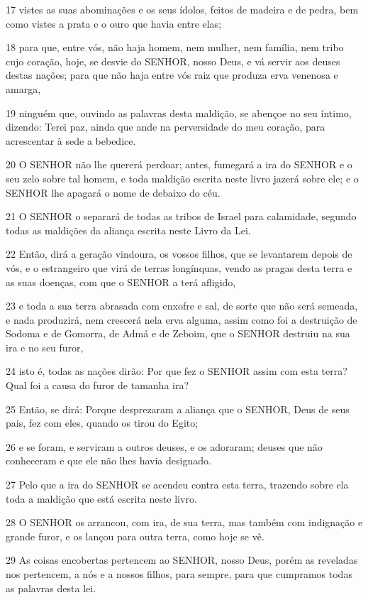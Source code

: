 \par 17 vistes as suas abominações e os seus ídolos, feitos de madeira e de pedra, bem como vistes a prata e o ouro que havia entre elas;
\par 18 para que, entre vós, não haja homem, nem mulher, nem família, nem tribo cujo coração, hoje, se desvie do SENHOR, nosso Deus, e vá servir aos deuses destas nações; para que não haja entre vós raiz que produza erva venenosa e amarga,
\par 19 ninguém que, ouvindo as palavras desta maldição, se abençoe no seu íntimo, dizendo: Terei paz, ainda que ande na perversidade do meu coração, para acrescentar à sede a bebedice.
\par 20 O SENHOR não lhe quererá perdoar; antes, fumegará a ira do SENHOR e o seu zelo sobre tal homem, e toda maldição escrita neste livro jazerá sobre ele; e o SENHOR lhe apagará o nome de debaixo do céu.
\par 21 O SENHOR o separará de todas as tribos de Israel para calamidade, segundo todas as maldições da aliança escrita neste Livro da Lei.
\par 22 Então, dirá a geração vindoura, os vossos filhos, que se levantarem depois de vós, e o estrangeiro que virá de terras longínquas, vendo as pragas desta terra e as suas doenças, com que o SENHOR a terá afligido,
\par 23 e toda a sua terra abrasada com enxofre e sal, de sorte que não será semeada, e nada produzirá, nem crescerá nela erva alguma, assim como foi a destruição de Sodoma e de Gomorra, de Admá e de Zeboim, que o SENHOR destruiu na sua ira e no seu furor,
\par 24 isto é, todas as nações dirão: Por que fez o SENHOR assim com esta terra? Qual foi a causa do furor de tamanha ira?
\par 25 Então, se dirá: Porque desprezaram a aliança que o SENHOR, Deus de seus pais, fez com eles, quando os tirou do Egito;
\par 26 e se foram, e serviram a outros deuses, e os adoraram; deuses que não conheceram e que ele não lhes havia designado.
\par 27 Pelo que a ira do SENHOR se acendeu contra esta terra, trazendo sobre ela toda a maldição que está escrita neste livro.
\par 28 O SENHOR os arrancou, com ira, de sua terra, mas também com indignação e grande furor, e os lançou para outra terra, como hoje se vê.
\par 29 As coisas encobertas pertencem ao SENHOR, nosso Deus, porém as reveladas nos pertencem, a nós e a nossos filhos, para sempre, para que cumpramos todas as palavras desta lei.

